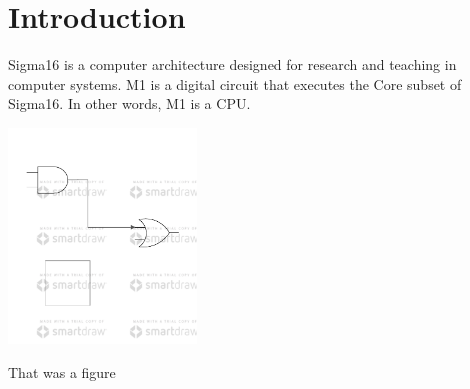 \documentclass[11pt]{article}
\date{\today}
\title{}
\begin{document}
\setcounter{tocdepth}{3}
\tableofcontents

\section*{Introduction}
\label{sec:org1510e14}

Sigma16 is a computer architecture designed for research and teaching
in computer systems.  M1 is a digital circuit that executes the Core
subset of Sigma16.  In other words, M1 is a CPU.


\begin{center}
\includegraphics[width=5cm]{./figures/smartdraw-test.pdf}
\end{center}

That was a figure
\end{document}
